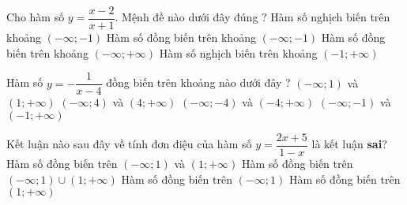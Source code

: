 \begin{ex}%
 Cho hàm số $ y=\dfrac{x-2}{x+1} $. Mệnh đề nào dưới đây đúng ?
 \choice
 {Hàm số nghịch biến trên khoảng $(-\infty ;-1)$}
 {\True Hàm số đồng biến trên khoảng $(-\infty ;-1)$}
 {Hàm số đồng biến trên khoảng $(-\infty ;+\infty)$}
 {Hàm số nghịch biến trên khoảng $(-1 ;+\infty)$}
\end{ex}
\begin{ex}%
 Hàm số $ y=-\dfrac{1}{x-4} $ đồng biến trên khoảng nào dưới đây ?
 \choice
 {$(-\infty ; 1)$ và $ (1 ;+\infty) $}
 {\True$(-\infty ; 4)$ và $ (4 ;+\infty) $}
 {$(-\infty ; -4)$ và $ (-4 ;+\infty) $}
 {$(-\infty ; -1)$ và $ (-1 ;+\infty) $}
\end{ex}
\begin{ex}%
 Kết luận nào sau đây về tính đơn điệu của hàm số $ y=\dfrac{2 x+5}{1-x} $ là kết luận \textbf{sai}?
 \choice
 {Hàm số đồng biến trên $(-\infty ; 1)$ và $ (1 ;+\infty) $}
 {\True Hàm số đồng biến trên $(-\infty ; 1) \cup(1 ;+\infty)$}
 {Hàm số đồng biến trên $(-\infty ; 1)$}
 {Hàm số đồng biến trên $(1 ;+\infty)$}
\end{ex}
